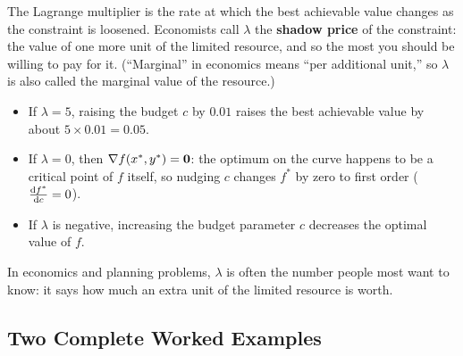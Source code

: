 The Lagrange multiplier is the rate at which the best achievable value changes as the constraint is loosened. Economists call $\lambda$ the \textbf{shadow price} of the constraint: the value of one more unit of the limited resource, and so the most you should be willing to pay for it. (``Marginal'' in economics means ``per additional unit,'' so $\lambda$ is also called the marginal value of the resource.)
\begin{itemize}
\item If $\lambda = 5$, raising the budget $c$ by $0.01$ raises the best achievable value by about $5 \times 0.01 = 0.05$.
\item If $\lambda = 0$, then $\nabla f(x^*,y^*) = \mathbf{0}$: the optimum on the curve happens to be a critical point of $f$ itself, so nudging $c$ changes $f^*$ by zero to first order ($\frac{\mathrm{d} f^*}{\mathrm{d} c} = 0$).
\item If $\lambda$ is negative, increasing the budget parameter $c$ decreases the optimal value of $f$.
\end{itemize}
In economics and planning problems, $\lambda$ is often the number people most want to know: it says how much an extra unit of the limited resource is worth.

\subsection{Two Complete Worked Examples}

